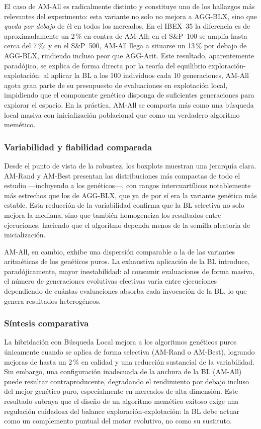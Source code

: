 El caso de AM-All es radicalmente distinto y constituye uno de los hallazgos más relevantes del experimento: esta variante no solo no mejora a AGG-BLX, sino que \textit{queda por debajo} de él en todos los mercados. En el IBEX~35 la diferencia es de aproximadamente un 2\,\% en contra de AM-All; en el S\&P~100 se amplía hasta cerca del 7\,\%; y en el S\&P~500, AM-All llega a situarse un 13\,\% por debajo de AGG-BLX, rindiendo incluso peor que AGG-Arit. Este resultado, aparentemente paradójico, se explica de forma directa por la teoría del equilibrio exploración-explotación: al aplicar la BL a los 100 individuos cada 10 generaciones, AM-All agota gran parte de su presupuesto de evaluaciones en explotación local, impidiendo que el componente genético disponga de suficientes generaciones para explorar el espacio. En la práctica, AM-All se comporta más como una búsqueda local masiva con inicialización poblacional que como un verdadero algoritmo memético.

\subsubsection*{Variabilidad y fiabilidad comparada}

Desde el punto de vista de la robustez, los boxplots muestran una jerarquía clara. AM-Rand y AM-Best presentan las distribuciones más compactas de todo el estudio ---incluyendo a los genéticos---, con rangos intercuartílicos notablemente más estrechos que los de AGG-BLX, que ya de por sí era la variante genética más estable. Esta reducción de la variabilidad confirma que la BL selectiva no solo mejora la mediana, sino que también homogeneiza los resultados entre ejecuciones, haciendo que el algoritmo dependa menos de la semilla aleatoria de inicialización.

AM-All, en cambio, exhibe una dispersión comparable a la de las variantes aritméticas de los genéticos puros. La exhaustiva aplicación de la BL introduce, paradójicamente, mayor inestabilidad: al consumir evaluaciones de forma masiva, el número de generaciones evolutivas efectivas varía entre ejecuciones dependiendo de cuántas evaluaciones absorba cada invocación de la BL, lo que genera resultados heterogéneos.

\subsubsection*{Síntesis comparativa}

La hibridación con Búsqueda Local mejora a los algoritmos genéticos puros únicamente cuando se aplica de forma selectiva (AM-Rand o AM-Best), logrando mejoras de hasta un 2\,\% en calidad y una reducción sustancial de la variabilidad. Sin embargo, una configuración inadecuada de la anchura de la BL (AM-All) puede resultar contraproducente, degradando el rendimiento por debajo incluso del mejor genético puro, especialmente en mercados de alta dimensión. Este resultado subraya que el diseño de un algoritmo memético exitoso exige una regulación cuidadosa del balance exploración-explotación: la BL debe actuar como un complemento puntual del motor evolutivo, no como su sustituto.

